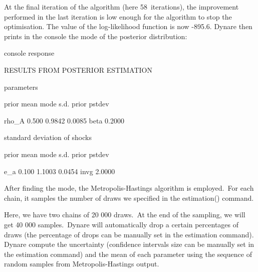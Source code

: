 \documentclass[a4paper,12pt]{article}%
\begin{document}
At the final iteration of the algorithm (here 58\ iterations), the improvement
performed in the last iteration is low enough for the algorithm to stop the
optimisation. The value of the log-likelihood function is now \textsf{-895.6}.
Dynare then prints in the console the mode of the posterior distribution:%

\vspace{3ex}
\begin{myresult}{console response}%


\textsf{RESULTS FROM POSTERIOR ESTIMATION}

\textsf{parameters}

\textsf{ prior mean mode s.d. prior pstdev}

\textsf{rho\_A 0.500 0.9842 0.0085 beta 0.2000 }

\textsf{standard deviation of shocks}

\textsf{ prior mean mode s.d. prior pstdev}

\textsf{e\_a 0.100 1.1003 0.0454 invg 2.0000 }%

\end{myresult}
\vspace{3ex}%


After finding the mode, the Metropolis-Hastings algorithm is employed.\ For
each chain, it samples the number of draws we specified in the estimation() command.

Here, we have two chains of 20 000 draws.\ At the end of the sampling, we will
get 40 000 samples.\ Dynare will automatically drop a certain percentages of
draws (the percentage of drops can be manually set in the estimation command).
Dynare compute the uncertainty (confidence intervals size can be manually set
in the estimation command) and the mean of each parameter using the sequence
of random samples from Metropolis-Hastings output.%
\end{document}
